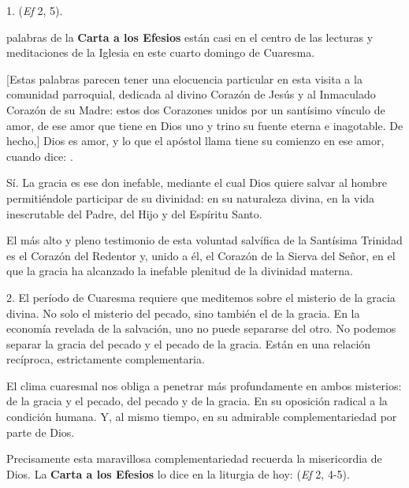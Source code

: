
\begin{body}
1.  (\textit{Ef} 2, 5).

 palabras de la \textbf{Carta a los Efesios} están casi en el centro de las lecturas y meditaciones de la Iglesia en este cuarto domingo de Cuaresma.

[Estas palabras parecen tener una elocuencia particular en esta visita a la comunidad parroquial, dedicada al divino Corazón de Jesús y al Inmaculado Corazón de su Madre: estos dos Corazones unidos por un santísimo vínculo de amor, de ese amor que tiene en Dios uno y trino su fuente eterna e inagotable. De hecho,] Dios es amor, y lo que el apóstol llama  tiene su comienzo en ese amor, cuando dice: .

Sí. La gracia es ese don inefable, mediante el cual Dios quiere salvar al hombre permitiéndole participar de su divinidad: en su naturaleza divina, en la vida inescrutable del Padre, del Hijo y del Espíritu Santo.

El más alto y pleno testimonio de esta voluntad salvífica de la Santísima Trinidad es el Corazón del Redentor y, unido a él, el Corazón de la Sierva del Señor, en el que la gracia ha alcanzado la inefable plenitud de la divinidad materna.

2. El período de Cuaresma requiere que meditemos sobre el misterio de la gracia divina. No solo el misterio del pecado, sino también el de la gracia. En la economía revelada de la salvación, uno no puede separarse del otro. No podemos separar la gracia del pecado y el pecado de la gracia. Están en una relación recíproca, estrictamente complementaria.

El clima cuaresmal nos obliga a penetrar más profundamente en ambos misterios: de la gracia y el pecado, del pecado y de la gracia. En su oposición radical a la condición humana. Y, al mismo tiempo, en su admirable complementariedad por parte de Dios.

Precisamente esta maravillosa complementariedad recuerda la misericordia de Dios. La \textbf{Carta a los Efesios} lo dice en la liturgia de hoy:  (\textit{Ef} 2, 4-5).


\end{body}
